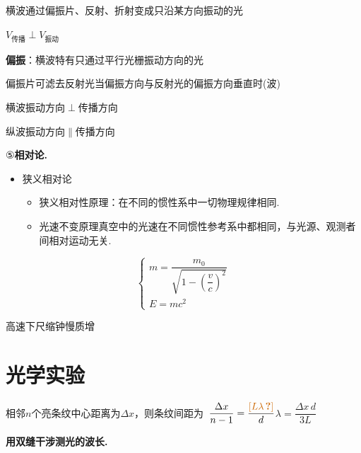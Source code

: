 \noindent\begin{minipage}[c]{0.6\linewidth}\end{minipage}\begin{minipage}[c]{0.2\linewidth}\end{minipage}

横波\quad 通过偏振片、反射、折射变成只沿某方向振动的光

$V_{\text{传播}}\perp V_{\text{振动}}$

\textbf{偏振}：横波特有\quad 只通过平行光栅振动方向的光

偏振片可滤去反射光\quad 当偏振方向与反射光的偏振方向垂直时(波)

横波\quad 振动方向$\perp$传播方向

纵波\quad 振动方向$\parallel$传播方向

⑤\quad \textbf{相对论.}
\begin{itemize}
\item 狭义相对论
 \begin{itemize}
 \item 狭义相对性原理：在不同的惯性系中一切物理规律相同. %
 \item 光速不变原理\quad 真空中的光速在不同惯性参考系中都相同，与光源、观测者间相对运动无关.
 \end{itemize}
\end{itemize}
\[ \left\{\begin{array}{l} m=\dfrac{m_0}{\sqrt{1-\left(\dfrac{v}{c}\right)^{2}}} \\[3ex] E=mc^{2} \end{array}\right. \]

高速下\quad 尺缩\quad 钟慢\quad 质增 %


\section{光学实验}
相邻$n$个亮条纹中心距离为$\Delta x$，则条纹间距为\ $\dfrac{\Delta x}{n-1}=\dfrac{\unclear{L\lambda}}{d}$\qquad $\lambda=\dfrac{\Delta x\,d}{3L}$

\textbf{用双缝干涉测光的波长.}

